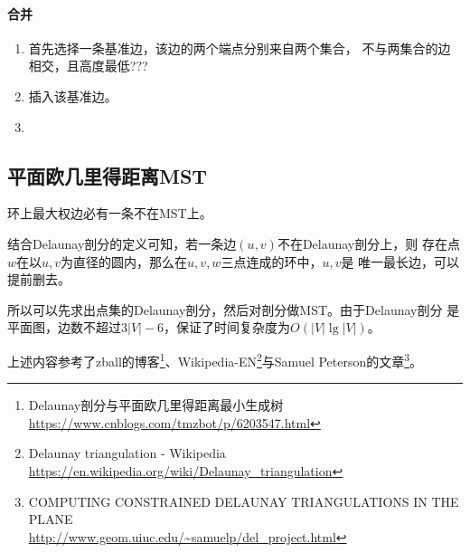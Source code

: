 \paragraph{合并}
\begin{enumerate}
    \item 首先选择一条基准边，该边的两个端点分别来自两个集合，
    不与两集合的边相交，且高度最低???
    \item 插入该基准边。
    \item
\end{enumerate}


\subsection{平面欧几里得距离MST}
\begin{property}
    环上最大权边必有一条不在MST上。
\end{property}

结合Delaunay剖分的定义可知，若一条边$(u,v)$不在Delaunay剖分上，则
存在点$w$在以$u,v$为直径的圆内，那么在$u,v,w$三点连成的环中，$u,v$是
唯一最长边，可以提前删去。

所以可以先求出点集的Delaunay剖分，然后对剖分做MST。由于Delaunay剖分
是平面图，边数不超过$3|V|-6$，保证了时间复杂度为$O(|V|\lg |V|)$。

上述内容参考了zball的博客\footnote{
    Delaunay剖分与平面欧几里得距离最小生成树\\
    \url{https://www.cnblogs.com/tmzbot/p/6203547.html}
}、Wikipedia-EN\footnote{
    Delaunay triangulation - Wikipedia\\
\url{https://en.wikipedia.org/wiki/Delaunay\_triangulation}
}与Samuel Peterson的文章\footnote{
    COMPUTING CONSTRAINED DELAUNAY TRIANGULATIONS IN THE PLANE\\
    \url{http://www.geom.uiuc.edu/\~samuelp/del\_project.html}
}。
